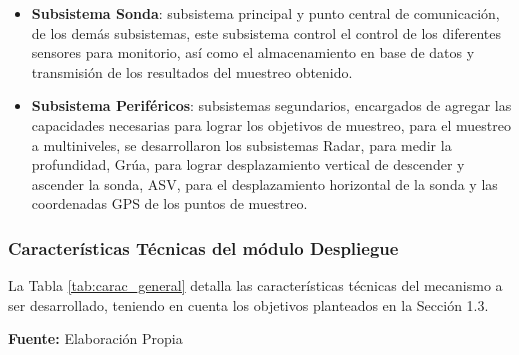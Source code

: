 \begin{itemize}
    \item \textbf{Subsistema Sonda}: subsistema principal y punto central de comunicaci\'on, de los dem\'as subsistemas, este subsistema control el control de los diferentes sensores para monitorio, as\'i como el almacenamiento en base de datos y transmisión de los resultados del muestreo obtenido.
    \item \textbf{Subsistema Perif\'ericos}: subsistemas segundarios, encargados de agregar las capacidades necesarias para lograr los objetivos de muestreo, para el muestreo a multiniveles, se desarrollaron los subsistemas Radar, para medir la profundidad, Gr\'ua, para lograr desplazamiento vertical de descender y ascender la sonda, ASV, para el desplazamiento horizontal de la sonda y las coordenadas GPS de los puntos de  muestreo. 
\end{itemize}

\subsubsection[Características Técnicas de los módulos]{Características Técnicas del módulo Despliegue}
La Tabla \ref{tab:carac_general} detalla las características técnicas del mecanismo a ser desarrollado, teniendo en cuenta los objetivos planteados en la Sección 1.3.
\begin{table}[H]
\protect\caption[Datos T\'ecnicos]{Datos T\'ecnicos. \label{tab:carac_general}}
    \centering
    \vspace{5mm}
    \newline
    \hfill \textbf{Fuente:} Elaboraci\'on Propia
\end{table}
